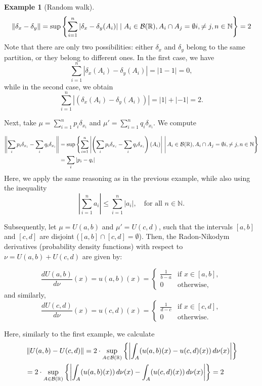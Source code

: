 \documentclass[10pt,a4paper]{amsart}
\theoremstyle{definition}
\theoremstyle{definition}
\newtheorem{example}[definition]{Example}
\theoremstyle{definition}
\theoremstyle{definition}
\theoremstyle{definition}
\theoremstyle{definition}
\begin{document}
\begin{example}[Random walk]
    \begin{align*}
      \left\lVert \delta_x - \delta_y \right\rVert = \sup \left\{ \sum_{i=1}^{n} |\delta_x - \delta_y (A_i)| \mid A_i \in \mathcal{B}(\mathbb{R}), A_i \cap A_j = \emptyset i,  \neq j, n \in \mathbb{N}  \right\} = 2
    \end{align*}
    Note that there are only two possibilities: either \(\delta_x\) and \(\delta_y\) belong to the same partition, or they belong to different ones. In the first case, we have
    \[
    \sum_{i=1}^{n} \left| \delta_x(A_i) - \delta_y(A_i) \right| = |1 - 1| = 0,
    \]
    while in the second case, we obtain
    \[
    \sum_{i=1}^{n} \left| \left( \delta_x(A_i) - \delta_y(A_i) \right) \right| = |1| + |-1| = 2.
    \]
    
    Next, take $\mu= \sum_{i=1}^{n} p_i \delta_{x_i}$ and  $\mu'= \sum_{i=1}^n q_i \delta_{x_i}$. We compute

    \begin{align*}
      \left\lVert \sum_i p_i \delta_{x_i} - \sum_i q_i \delta_{x_i} \right\rVert &
      = \sup \left\{ \sum_{i=1}^{n} \left\lvert \left(\sum_i p_i \delta_{x_i} - \sum_i q_i \delta_{x_i} \right) (A_i) \right\rvert \,\Bigg| \, A_i \in \mathcal{B}(\mathbb{R}), A_i \cap A_j = \emptyset i,  \neq j, n \in \mathbb{N}  \right\} \\
      & = \sum_i |p_i-q_i|
    \end{align*}
    Here, we apply the same reasoning as in the previous example, while also using the inequality
\[
\left| \sum_{i=1}^{n} a_i \right| \leq \sum_{i=1}^{n} |a_i|, \quad \text{for all } n \in \mathbb{N}.
\]

Subsequently, let $\mu = U(a,b)$ and  $\mu'=U(c,d)$, such that the intervals $[a,b]$ and $[c,d]$ are disjoint ($[a, b] \cap [c, d] = \emptyset$). Then, the Radon-Nikodym derivatives (probability density functions) with respect to \( \nu = U(a, b) + U(c, d) \) are given by:

\[
\frac{dU(a, b)}{d\nu}(x) = u(a,b)(x) = 
\begin{cases} 
\frac{1}{b - a} & \text{if } x \in [a, b], \\ 
0 & \text{otherwise},
\end{cases}
\]
and similarly,
\[
\frac{dU(c, d)}{d\nu}(x) = u(c,d)(x) = 
\begin{cases} 
\frac{1}{d - c} & \text{if } x \in [c, d], \\ 
0 & \text{otherwise}.
\end{cases}
\]

Here, similarly to the first example, we calculate
\begin{align*}
  &\left\lVert U(a,b)-U(c,d) \right\rVert = 2 \cdot \sup_{A \in \mathcal{B}(\mathbb{R})}  \left\{ \left\vert\int_A (u(a,b)(x)- u(c,d)(x)) \, d \nu(x) \right\vert \right\} \\
  & = 2 \cdot \sup_{A \in \mathcal{B}(\mathbb{R})}  \left\{ \left\vert\int_A (u(a,b)(x)) \, d \nu(x)  - \int_A (u(c,d)(x)) \,  d\nu(x) \right\vert \right\} = 2
\end{align*}


\end{example}
\end{document}
